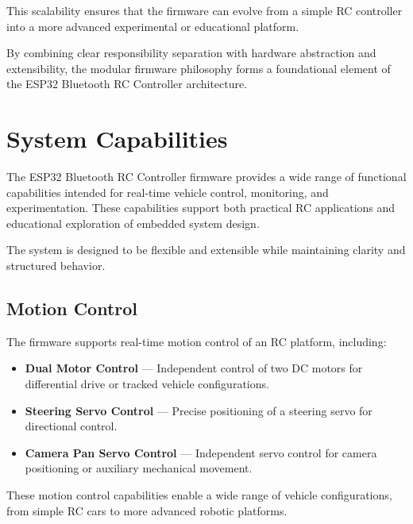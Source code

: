 This scalability ensures that the firmware can evolve from a simple RC controller into a more advanced experimental or educational platform.

By combining clear responsibility separation with hardware abstraction and extensibility, the modular firmware philosophy forms a foundational element of the ESP32 Bluetooth RC Controller architecture.
















\section{System Capabilities}

The ESP32 Bluetooth RC Controller firmware provides a wide range of functional capabilities intended for real-time vehicle control, monitoring, and experimentation. These capabilities support both practical RC applications and educational exploration of embedded system design.

The system is designed to be flexible and extensible while maintaining clarity and structured behavior.

\subsection{Motion Control}

The firmware supports real-time motion control of an RC platform, including:

\begin{itemize}
	\item \textbf{Dual Motor Control} — Independent control of two DC motors for differential drive or tracked vehicle configurations.
	
	\item \textbf{Steering Servo Control} — Precise positioning of a steering servo for directional control.
	
	\item \textbf{Camera Pan Servo Control} — Independent servo control for camera positioning or auxiliary mechanical movement.
\end{itemize}

These motion control capabilities enable a wide range of vehicle configurations, from simple RC cars to more advanced robotic platforms.

